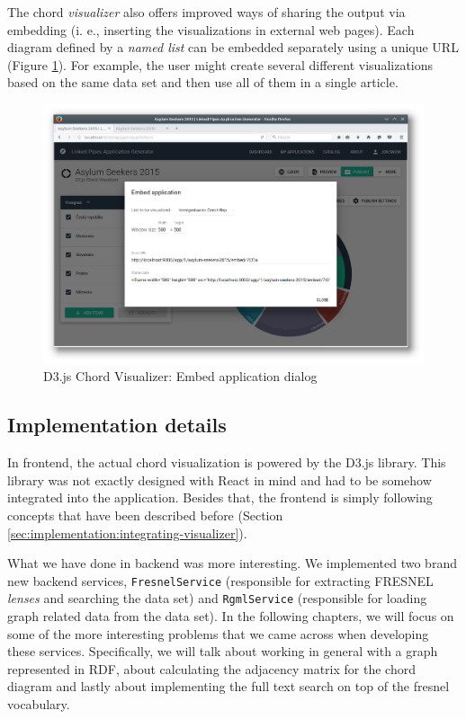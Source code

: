 The chord \emph{visualizer} also offers improved ways of sharing the output via embedding (i. e., inserting the visualizations in external web pages). Each diagram defined by a \emph{named list} can be embedded separately using a unique URL (Figure \ref{fig:chord-embed-configuration}). For example, the user might create several different visualizations based on the same data set and then use all of them in a single article.

\begin{figure}
	\centering
	\includegraphics[width=145mm]{img/06_chord_embed_configuration}
	\caption{D3.js Chord Visualizer: Embed application dialog}
    \label{fig:chord-embed-configuration}
\end{figure}

\subsection{Implementation details}

In frontend, the actual chord visualization is powered by the D3.js library. This library was not exactly designed with React in mind and had to be somehow integrated into the application. Besides that, the frontend is simply following concepts that have been described before (Section \ref{sec:implementation:integrating-visualizer}).

What we have done in backend was more interesting. We implemented two brand new backend services, \texttt{FresnelService} (responsible for extracting FRESNEL \emph{lenses} and searching the data set) and \texttt{RgmlService} (responsible for loading graph related data from the data set). In the following chapters, we will focus on some of the more interesting problems that we came across when developing these services. Specifically, we will talk about working in general with a graph represented in RDF, about calculating the adjacency matrix for the chord diagram and lastly about implementing the full text search on top of the fresnel vocabulary.

